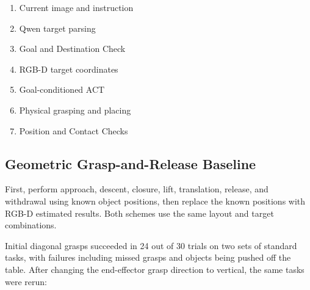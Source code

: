 \begin{enumerate}
\def\labelenumi{\arabic{enumi}.}
\tightlist
\item
  Current image and instruction
\item
  Qwen target parsing
\item
  Goal and Destination Check
\item
  RGB-D target coordinates
\item
  Goal-conditioned ACT
\item
  Physical grasping and placing
\item
  Position and Contact Checks
\end{enumerate}


\subsection{Geometric Grasp-and-Release Baseline}\label{s05-detail-2}

First, perform approach, descent, closure, lift, translation, release, and withdrawal using known object positions, then replace the known positions with RGB-D estimated results. Both schemes use the same layout and target combinations.

Initial diagonal grasps succeeded in 24 out of 30 trials on two sets of standard tasks, with failures including missed grasps and objects being pushed off the table. After changing the end-effector grasp direction to vertical, the same tasks were rerun:

